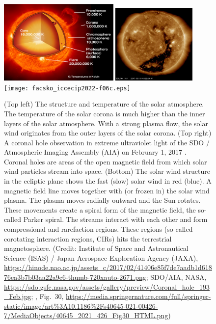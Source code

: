 \documentclass[sn-aps]{sn-jnl}%
\begin{document}
\begin{figure}[t]
\centering
\includegraphics[width=0.525\textwidth]{facsko_iccecip2022-f06a.eps}
\includegraphics[width=0.37\textwidth]{facsko_iccecip2022-f06b.eps}
\texttt{[image: facsko\_iccecip2022-f06c.eps]}
\caption{(Top left) The structure and temperature of the solar atmosphere. The temperature of the solar corona is much higher than the inner layers of the solar atmosphere. With a strong plasma flow, the solar wind originates from the outer layers of the solar corona. (Top right) A coronal hole observation in extreme ultraviolet light of the SDO / Atmospheric Imaging Assembly (AIA) on February 1, 2017 \cite{pesnell12:_solar_dynam_obser_sdo,lemen12:_atmos_imagin_assem_aia_solar}.  Coronal holes are areas of the open magnetic field from which solar wind particles stream into space. (Bottom) The solar wind structure in the ecliptic plane shows the fast (slow) solar wind in red (blue). A magnetic field line moves together with (or frozen in) the solar wind plasma. The plasma moves radially outward and the Sun rotates. These movements create a spiral form of the magnetic field, the so-called Parker spiral. The streams interact with each other and form compressional and rarefaction regions. These regions (so-called corotating interaction regions, CIRs) hits the terrestrial magnetosphere. (Credit: Institute of Space and Astronautical Science (ISAS) / Japan Aerospace Exploration Agency (JAXA), \url{https://hinode.nao.ac.jp/assets_c/2017/02/41406e85f7de7aadb1d61876ea3b7b03aa22a9c6-thumb-720xauto-2671.png}; SDO/AIA, NASA, \url{https://sdo.gsfc.nasa.gov/assets/gallery/preview/Coronal_hole_193_Feb.jpg}; \cite{zhang21:_earth}, Fig.~30, \url{https://media.springernature.com/full/springer-static/image/art\%3A10.1186\%2Fs40645-021-00426-7/MediaObjects/40645\_2021\_426\_Fig30\_HTML.png})}\label{fig:corona}
\end{figure}
\end{document}
